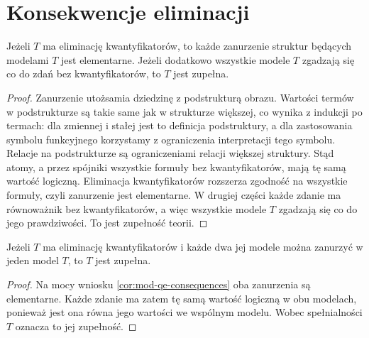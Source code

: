 \section{Konsekwencje eliminacji}
\begin{wniosek}
\label{cor:mod-qe-consequences}
Jeżeli $T$ ma eliminację kwantyfikatorów, to każde
zanurzenie struktur będących modelami $T$ jest elementarne.
Jeżeli dodatkowo wszystkie modele $T$ zgadzają się co do
zdań bez kwantyfikatorów, to $T$ jest zupełna.
\end{wniosek}
\begin{proof}
Zanurzenie utożsamia dziedzinę z podstrukturą obrazu.
Wartości termów w podstrukturze są takie same jak
w strukturze większej, co wynika z indukcji po termach:
dla zmiennej i stałej jest to definicja podstruktury,
a dla zastosowania symbolu funkcyjnego korzystamy z
ograniczenia interpretacji tego symbolu. Relacje na
podstrukturze są ograniczeniami relacji większej struktury.
Stąd atomy, a przez spójniki wszystkie formuły bez
kwantyfikatorów, mają tę samą wartość logiczną.
Eliminacja kwantyfikatorów rozszerza zgodność na wszystkie
formuły, czyli zanurzenie jest elementarne.
W drugiej części każde zdanie ma równoważnik bez
kwantyfikatorów, a więc wszystkie modele $T$ zgadzają
się co do jego prawdziwości. To jest zupełność teorii.
\end{proof}

\begin{wniosek}
\label{cor:mod-qe-joint-embedding}
Jeżeli $T$ ma eliminację kwantyfikatorów i każde dwa
jej modele można zanurzyć w jeden model $T$, to $T$
jest zupełna.
\end{wniosek}
\begin{proof}
Na mocy wniosku \ref{cor:mod-qe-consequences} oba
zanurzenia są elementarne. Każde zdanie ma zatem
tę samą wartość logiczną w obu modelach, ponieważ
jest ona równa jego wartości we wspólnym modelu.
Wobec spełnialności $T$ oznacza to jej zupełność.
\end{proof}

